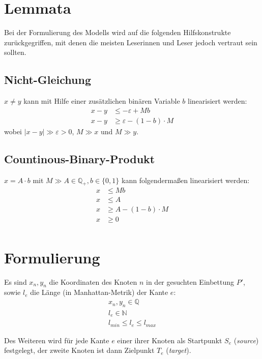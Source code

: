 \documentclass[a4paper,11pt]{amsart}
\begin{document}
\section*{Lemmata}

\noindent Bei der Formulierung des Modells wird auf die folgenden Hilfskonstrukte zurückgegriffen, mit denen die meisten Leserinnen und Leser jedoch vertraut sein sollten.

\subsection*{Nicht-Gleichung} $x \ne y$ kann mit Hilfe einer zusätzlichen binären Variable $b$ linearisiert werden:
\begin{align*}
x - y &\le - \varepsilon + M b\\
x - y &\ge \varepsilon - (1-b)\cdot M
\end{align*}
wobei $\left|x-y\right| \gg \varepsilon > 0$, $M \gg x$ und $M \gg y$.
\bigskip

\subsection*{Countinous-Binary-Produkt}$x = A \cdot b$ mit $M \gg A \in \mathbb{Q_+}, b \in \{0, 1\}$ kann folgendermaßen linearisiert werden:
\begin{align*}
x &\le M b\\
x &\le A\\
x &\ge A - (1-b) \cdot M\\
x &\ge 0\\
\end{align*}

\section*{Formulierung}

\noindent Es sind $x_n, y_n$ die Koordinaten des Knoten $n$ in der gesuchten Einbettung $P'$, sowie $l_e$ die Länge (in Manhattan-Metrik) der Kante $e$:
\bigskip
\begin{gather*}
x_n, y_n \in \mathbb{Q}\\
l_e \in \mathbb{N} \\
l_{min} \le l_e \le l_{max}
\end{gather*}
\bigskip

\noindent Des Weiteren wird für jede Kante $e$ einer ihrer Knoten als Startpunkt $S_e$ (\textit{source}) festgelegt, der zweite Knoten ist dann Zielpunkt $T_e$ (\textit{target}).\\
\end{document}
